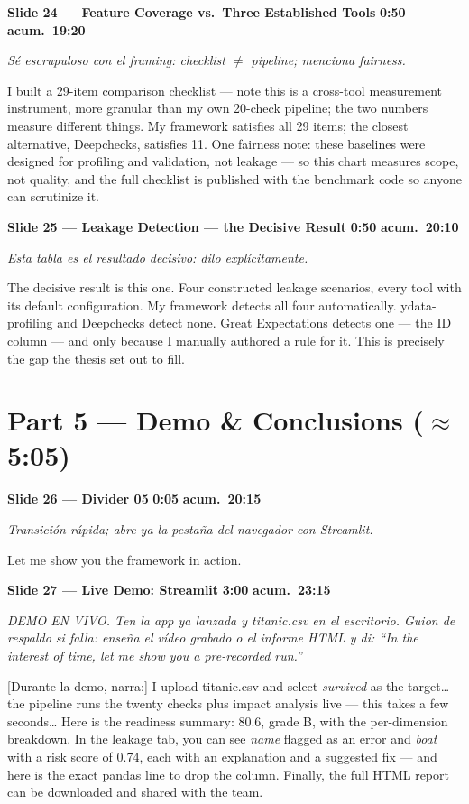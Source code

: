 \documentclass[11pt,a4paper]{article}
\newcommand{\slide}[6]{%
\begin{mdframed}[backgroundcolor=paleBlue, linecolor=upmBlue, linewidth=1pt,
                 roundcorner=4pt, skipabove=10pt, skipbelow=2pt,
                 innertopmargin=6pt, innerbottommargin=6pt]
\textbf{\color{upmBlue}Slide #1 --- #2}\hfill
\colorbox{upmOrange}{\color{white}\small\textbf{ #3 }}\;%
\colorbox{upmBlue}{\color{white}\small\textbf{ acum.\ #4 }}
\end{mdframed}
{\small\itshape\color{grayTxt}#5}\par\vspace{2pt}
#6\par\vspace{6pt}}
\begin{document}
\slide{24}{Feature Coverage vs.\ Three Established Tools}{0:50}{19:20}
{Sé escrupuloso con el framing: checklist $\neq$ pipeline; menciona fairness.}
{I built a 29-item comparison checklist --- note this is a cross-tool
measurement instrument, more granular than my own 20-check pipeline; the two
numbers measure different things. My framework satisfies all 29 items; the
closest alternative, Deepchecks, satisfies 11. One fairness note: these
baselines were designed for profiling and validation, not leakage --- so this
chart measures scope, not quality, and the full checklist is published with
the benchmark code so anyone can scrutinize it.}

\slide{25}{Leakage Detection --- the Decisive Result}{0:50}{20:10}
{Esta tabla es el resultado decisivo: dilo explícitamente.}
{The decisive result is this one. Four constructed leakage scenarios, every
tool with its default configuration. My framework detects all four
automatically. ydata-profiling and Deepchecks detect none. Great Expectations
detects one --- the ID column --- and only because I manually authored a rule
for it. This is precisely the gap the thesis set out to fill.}

\section*{\color{upmBlue}Part 5 --- Demo \& Conclusions (\normalfont$\approx$5:05)}

\slide{26}{Divider 05}{0:05}{20:15}
{Transición rápida; abre ya la pestaña del navegador con Streamlit.}
{Let me show you the framework in action.}

\slide{27}{Live Demo: Streamlit}{3:00}{23:15}
{DEMO EN VIVO. Ten la app ya lanzada y titanic.csv en el escritorio.
Guion de respaldo si falla: enseña el vídeo grabado o el informe HTML y di:
``In the interest of time, let me show you a pre-recorded run.''}
{[Durante la demo, narra:] I upload titanic.csv and select \emph{survived} as
the target\ldots{} the pipeline runs the twenty checks plus impact analysis
live --- this takes a few seconds\ldots{} Here is the readiness summary: 80.6,
grade B, with the per-dimension breakdown. In the leakage tab, you can see
\emph{name} flagged as an error and \emph{boat} with a risk score of 0.74,
each with an explanation and a suggested fix --- and here is the exact pandas
line to drop the column. Finally, the full HTML report can be downloaded and
shared with the team.}
\end{document}
